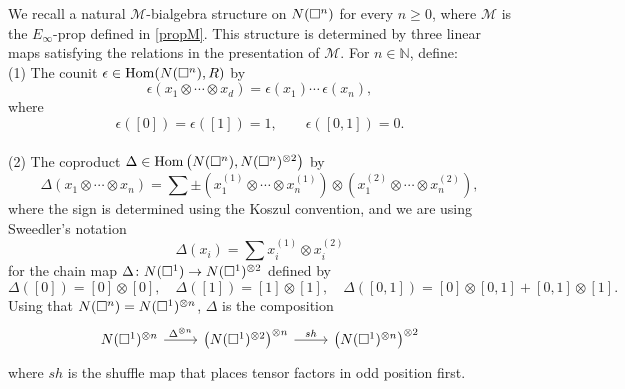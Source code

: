 We recall a natural $\mathcal M$-bialgebra structure on $N(\square^n)$ for every $n \geq 0$, where $\mathcal M$ is the $E_{\infty}$-prop defined in \ref{propM}. This structure is determined by three linear maps satisfying the relations in the presentation of $\mathcal M$.
For $n \in \mathbb{N}$, define: \vspace*{5pt} \\
(1) The counit $\epsilon \in \mathrm{Hom}(N(\square^n), R)$ by
\begin{equation*}
\epsilon \left( x_1 \otimes \cdots \otimes x_d \right) = \epsilon(x_1) \cdots \, \epsilon(x_n),
\end{equation*}
where
\begin{equation*}
\epsilon([0]) = \epsilon([1]) = 1, \qquad \epsilon([0, 1]) = 0.
\end{equation*} \vspace*{-6pt} \\
(2) The coproduct $\Delta \in \mathrm{Hom} \left( N(\square^n), N(\square^n)^{\otimes 2} \right)$ by
\begin{equation*}	
\Delta (x_1 \otimes \cdots \otimes x_n) = 	
\sum \pm \left( x_1^{(1)} \otimes \cdots \otimes x_n^{(1)} \right) \otimes 	
\left( x_1^{(2)} \otimes \cdots \otimes x_n^{(2)} \right),	
\end{equation*}	
where the sign is determined using the Koszul convention, and we are using Sweedler's notation
\begin{equation*}	
\Delta(x_i) = \sum x_i^{(1)} \otimes x_i^{(2)}
\end{equation*}
for the chain map $\Delta \colon N(\square^1) \to N(\square^1)^{\otimes 2}$ defined by
\begin{equation*}
\Delta([0]) = [0] \otimes [0], \quad \Delta([1]) = [1] \otimes [1], \quad \Delta([0, 1]) = [0] \otimes [0, 1] + [0, 1] \otimes [1].
\end{equation*}
Using that $N(\square^n) = N(\square^1)^{\otimes n}$, $\Delta$ is the composition
\begin{equation*}
\begin{tikzcd}
\cchains(\square^1)^{\otimes n} \arrow[r, "\Delta^{\otimes n}"] & \left( \cchains(\square^1)^{\otimes 2}  \right)^{\otimes n} \arrow[r, "sh"] & \left( \cchains(\square^1)^{\otimes n} \right)^{\otimes 2}
\end{tikzcd}
\end{equation*}
where $sh$ is the shuffle map that places tensor factors in odd position first. \vspace*{5pt} \\
